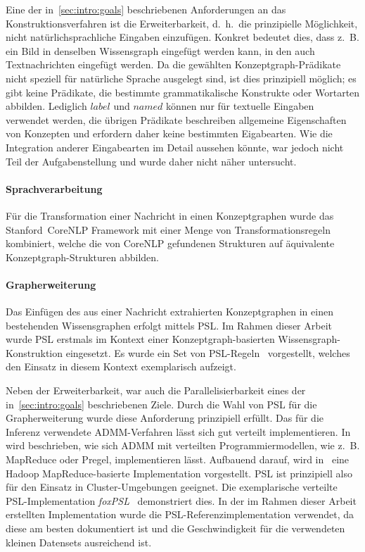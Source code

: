 Eine der in~\ref{sec:intro:goals} beschriebenen Anforderungen an das Konstruktionsverfahren ist die Erweiterbarkeit, d.~h.\ die prinzipielle Möglichkeit, nicht natürlichsprachliche Eingaben einzufügen.
Konkret bedeutet dies, dass z.~B. ein Bild in denselben Wissensgraph eingefügt werden kann, in den auch Textnachrichten eingefügt werden.
Da die gewählten Konzeptgraph-Prädikate nicht speziell für natürliche Sprache ausgelegt sind, ist dies prinzipiell möglich;
es gibt keine Prädikate, die bestimmte grammatikalische Konstrukte oder Wortarten abbilden.
Lediglich $label$ und $named$ können nur für textuelle Eingaben verwendet werden, die übrigen Prädikate beschreiben allgemeine Eigenschaften von Konzepten und erfordern daher keine bestimmten Eigabearten.
Wie die Integration anderer Eingabearten im Detail aussehen könnte, war jedoch nicht Teil der Aufgabenstellung und wurde daher nicht näher untersucht.

\paragraph{Sprachverarbeitung}
Für die Transformation einer Nachricht in einen Konzeptgraphen wurde das Stanford~CoreNLP Framework mit einer Menge von Transformationsregeln~ kombiniert, welche die von CoreNLP gefundenen Strukturen auf äquivalente Konzeptgraph-Strukturen abbilden.

\paragraph{Grapherweiterung}
Das Einfügen des aus einer Nachricht extrahierten Konzeptgraphen in einen bestehenden Wissensgraphen erfolgt mittels PSL.\@
Im Rahmen dieser Arbeit wurde PSL erstmals im Kontext einer Konzeptgraph-basierten Wissensgraph-Konstruktion eingesetzt.
Es wurde ein Set von PSL-Regeln~ vorgestellt, welches den Einsatz in diesem Kontext exemplarisch aufzeigt.

Neben der Erweiterbarkeit, war auch die Parallelisierbarkeit eines der in~\ref{sec:intro:goals} beschriebenen Ziele.
Durch die Wahl von PSL für die Grapherweiterung wurde diese Anforderung prinzipiell erfüllt.
Das für die Inferenz verwendete ADMM-Verfahren lässt sich gut verteilt implementieren.
In~\cite[Kapitel 10]{Boyd2011} wird beschrieben, wie sich ADMM mit verteilten Programmiermodellen, wie z.~B. MapReduce oder Pregel, implementieren lässt.
Aufbauend darauf, wird in~\cite{Lubell-Doughtie2013} eine Hadoop MapReduce-basierte Implementation vorgestellt.
PSL ist prinzipiell also für den Einsatz in Cluster-Umgebungen geeignet.
Die exemplarische verteilte PSL-Implementation \textit{foxPSL}~\cite{Magliacane2015} demonstriert dies.
In der im Rahmen dieser Arbeit erstellten Implementation wurde die PSL-Referenzimplementation verwendet, da diese am besten dokumentiert ist und die Geschwindigkeit für die verwendeten kleinen Datensets ausreichend ist.

